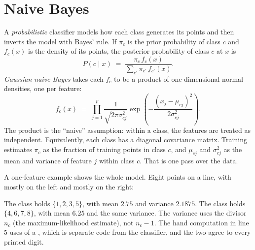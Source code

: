 \section{Naive Bayes}
\label{sec:ml-bayes}

A \emph{probabilistic} classifier models how each class generates its points and
then inverts the model with Bayes' rule. If \(\pi_c\) is the
prior probability of class \(c\) and \(f_c(x)\) is the density of its points, the
posterior probability of class \(c\) at \(x\) is
\[
  P(c \mid x) \;=\; \frac{\pi_c\, f_c(x)}{\sum_{c'} \pi_{c'}\, f_{c'}(x)} .
\]
\emph{Gaussian naive Bayes} takes each \(f_c\) to be a product
of one-dimensional normal densities, one per feature:
\[
  f_c(x) \;=\; \prod_{j=1}^{p} \frac{1}{\sqrt{2\pi\sigma_{cj}^2}}
    \exp\!\left(-\frac{(x_j - \mu_{cj})^2}{2\sigma_{cj}^2}\right).
\]
The product is the ``naive'' assumption: within a class, the features are treated
as independent. Equivalently, each class has a diagonal covariance matrix.
Training estimates \(\pi_c\) as the fraction of training points in class \(c\),
and \(\mu_{cj}\) and \(\sigma^2_{cj}\) as the mean and variance of feature \(j\)
within class \(c\). That is one pass over the data.

A one-feature example shows the whole model. Eight points on a line, with
 mostly on the left and  mostly on the right:

\begin{codepairs}
\end{codepairs}

The class  holds \(\{1,2,3,5\}\), with mean \(2.75\) and variance
\(2.1875\). The class  holds \(\{4,6,7,8\}\), with mean \(6.25\) and
the same variance. The variance uses the divisor \(n_c\) (the maximum-likelihood
estimate), not \(n_c - 1\). The hand computation in line 5 uses  of a
, which is separate code from the classifier, and the two
agree to every printed digit.

